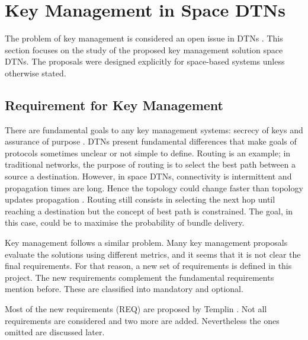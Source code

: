 \section{Key Management in Space DTNs}
\label{sec:survey}


The problem of key management is considered an open issue in DTNs \cite{menesidou2016automated}. This section focuses on the study of the proposed key management solution space DTNs.  The proposals were designed explicitly for space-based systems unless otherwise stated.



\subsection{Requirement for Key Management}

There are fundamental goals to any key management systems: secrecy of keys and assurance of purpose \cite{martineveryday}. DTNs present fundamental differences that make goals of protocols sometimes unclear or not simple to define. Routing is an example; in traditional networks, the purpose of routing is to select the best path between a source a destination. However, in space DTNs, connectivity is intermittent and propagation times are long. Hence the topology could change faster than topology updates propagation \cite{araniti2015contact}. Routing still consists in selecting the next hop until reaching a destination but the concept of best path is constrained.  The goal, in this case, could be to maximise the probability of bundle delivery.

Key management follows a similar problem. Many key management proposals evaluate the solutions using different metrics, and it seems that it is not clear the final requirements. For that reason, a new set of requirements is defined in this project. The new requirements complement the fundamental requirements mention before. These are classified into mandatory and optional. 

  
Most of the new requirements (REQ) are proposed by Templin \cite{templin-dtnskmreq-00}. Not all requirements are considered and two more are added. Nevertheless the ones omitted are discussed later. 



